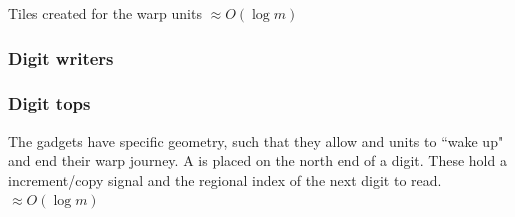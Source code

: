         Tiles created for the warp units $\approx O(\log m)$
    \subsubsection{ Digit writers }

    \subsubsection{ Digit tops }
    The {\dtop} gadgets have specific geometry, such that they allow {\firstwarp} and
    {\secondwarp} units to ``wake up" and end their warp journey. A {\dtop} is placed on
    the north end of a digit. These hold a increment/copy signal and the regional index
    of the next digit to read. $\approx O(\log m)$
    \vspace{1cm}

